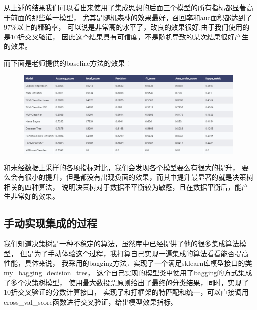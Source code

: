 \documentclass{article}
\begin{document}
从上述的结果我们可以看出来使用了集成思想的后面三个模型的所有指标都显著高于前面的那些单一模型，
尤其是随机森林的效果最好，召回率和auc面积都达到了97\%以上的精确率，
可以说是非常高的水平了，改良的效果很好,由于我们使用的是10折交叉验证，
因此这个结果具有可信度，不是随机导致的某次结果很好产生的效果。

而下面是老师提供的baseline方法的效果：

\begin{figure}[H]
	\centering
	\includegraphics[width=\textwidth]{./img/baseline_result.png}
\end{figure}

和未经数据上采样的各项指标对比，我们会发现各个模型要么有很大的提升，
要么会有很小的提升，但是都没有出现负面的效果，而其中提升最显著的就是决策树相关的四种算法，
说明决策树对于数据不平衡较为敏感，且在数据平衡后，能产生非常好的效果。

\subsection{手动实现集成的过程}

我们知道决策树是一种不稳定的算法，虽然库中已经提供了他的很多集成算法模型， 但是为了手动体验这个过程，我打算自己实现一遍集成的算法看看能否提高性能，具体来说，
我采用的bagging方法，实现了一个满足sklearn库模型接口的类my\_bagging\_decision\_tree，
这个自己实现的模型类中使用了bagging的方式集成了多个决策树模型， 使用最大数投票原则给出了最终的分类结果，同时，实现了10折交叉验证的分数计算接口，
实现了和打框架的特匹配和统一，可以直接调用cross\_val\_score函数进行交叉验证，给出模型效果指标。
\end{document}
